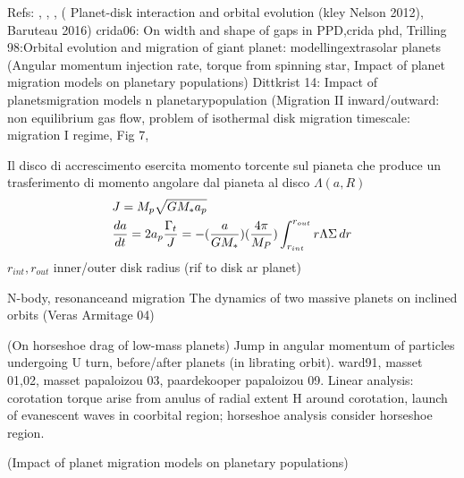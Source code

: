 \begin{workout}

\end{workout}

\begin{workout}
Refs: \cite{ward1997protoplanet}, \cite{terquem2000disks}, \cite{menou2004low}, (
Planet-disk interaction and orbital evolution (kley Nelson 2012), 
Baruteau 2016)
crida06: On width and shape of gaps in PPD,crida phd, 
Trilling 98:Orbital evolution and migration of giant planet: modellingextrasolar planets (Angular momentum injection rate, torque from spinning star, Impact of planet migration models on planetary populations)
Dittkrist 14: Impact of planetsmigration models n planetarypopulation (Migration II inward/outward: non equilibrium gas flow, problem of isothermal disk migration timescale: migration I regime, Fig 7,
\end{workout}

Il disco di accrescimento esercita momento torcente sul pianeta che produce un trasferimento di momento angolare dal pianeta al disco $\Lambda(a,R)$
\begin{align*}
&J=M_p\sqrt{GM_*a_p}\\
&\TDy{t}{a}=2a_p\frac{\Gamma_t}{J}=-(\frac{a}{GM_*})(\frac{4\pi}{M_P})\int_{r_{int}}^{r_{out}}r\Lambda\Sigma\,dr
\end{align*}
$r_{int}, r_{out}$ inner/outer disk radius (rif to disk ar planet)

\begin{workout}
N-body, resonanceand migration
The dynamics of two massive planets on inclined orbits (Veras Armitage 04)
\end{workout}

\begin{workout}
(On horseshoe drag of low-mass planets)
Jump in angular momentum of particles undergoing U turn, before/after planets (in librating orbit).
ward91, masset 01,02, masset papaloizou 03, paardekooper papaloizou 09.
Linear analysis: corotation torque arise from anulus of radial extent H around corotation, launch of evanescent waves in coorbital region; horseshoe analysis consider horseshoe region.
\end{workout}

\begin{workout}
(Impact of planet migration models on planetary populations)
\end{workout}

